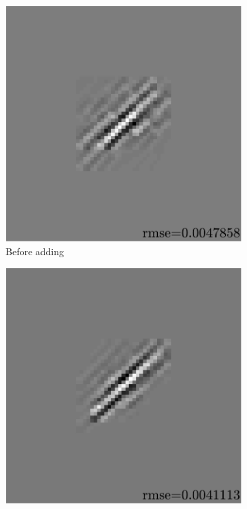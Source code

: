 \begin{figure}[!ht]
\begin{subfigure}[b]{0.32\linewidth}
\includegraphics[width=\linewidth]{figures/before_after/xp_128x128_sc2_angl1_K3_S3_node4before_approx.pdf}
\caption{Before adding}
\end{subfigure}
\begin{subfigure}[b]{0.32\linewidth}\centering
\includegraphics[width=\linewidth]{figures/before_after/xp_128x128_sc2_angl1_K3_S3_node4after_approx.pdf}

\end{subfigure}
\end{figure}
